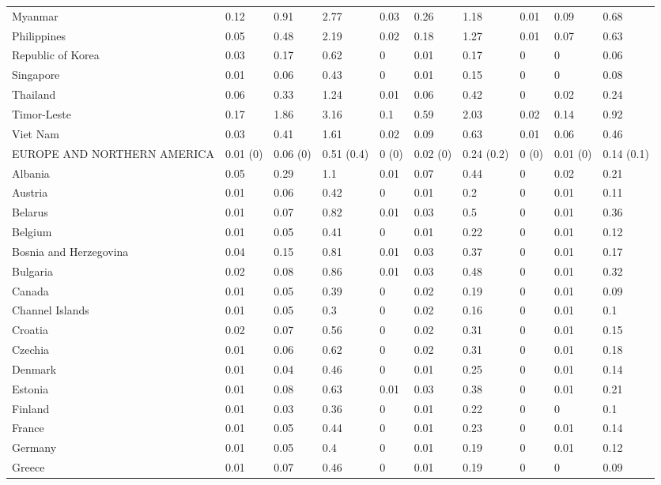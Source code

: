 \begin{longtable}[t]{llllllllll}
Myanmar & 0.12 & 0.91 & 2.77 & 0.03 & 0.26 & 1.18 & 0.01 & 0.09 & 0.68\\
Philippines & 0.05 & 0.48 & 2.19 & 0.02 & 0.18 & 1.27 & 0.01 & 0.07 & 0.63\\
Republic of Korea & 0.03 & 0.17 & 0.62 & 0 & 0.01 & 0.17 & 0 & 0 & 0.06\\
Singapore & 0.01 & 0.06 & 0.43 & 0 & 0.01 & 0.15 & 0 & 0 & 0.08\\
Thailand & 0.06 & 0.33 & 1.24 & 0.01 & 0.06 & 0.42 & 0 & 0.02 & 0.24\\
Timor-Leste & 0.17 & 1.86 & 3.16 & 0.1 & 0.59 & 2.03 & 0.02 & 0.14 & 0.92\\
Viet Nam & 0.03 & 0.41 & 1.61 & 0.02 & 0.09 & 0.63 & 0.01 & 0.06 & 0.46\\
EUROPE AND NORTHERN AMERICA & 0.01 (0) & 0.06 (0) & 0.51 (0.4) & 0 (0) & 0.02 (0) & 0.24 (0.2) & 0 (0) & 0.01 (0) & 0.14 (0.1)\\
Albania & 0.05 & 0.29 & 1.1 & 0.01 & 0.07 & 0.44 & 0 & 0.02 & 0.21\\
Austria & 0.01 & 0.06 & 0.42 & 0 & 0.01 & 0.2 & 0 & 0.01 & 0.11\\
Belarus & 0.01 & 0.07 & 0.82 & 0.01 & 0.03 & 0.5 & 0 & 0.01 & 0.36\\
Belgium & 0.01 & 0.05 & 0.41 & 0 & 0.01 & 0.22 & 0 & 0.01 & 0.12\\
Bosnia and Herzegovina & 0.04 & 0.15 & 0.81 & 0.01 & 0.03 & 0.37 & 0 & 0.01 & 0.17\\
Bulgaria & 0.02 & 0.08 & 0.86 & 0.01 & 0.03 & 0.48 & 0 & 0.01 & 0.32\\
Canada & 0.01 & 0.05 & 0.39 & 0 & 0.02 & 0.19 & 0 & 0.01 & 0.09\\
Channel Islands & 0.01 & 0.05 & 0.3 & 0 & 0.02 & 0.16 & 0 & 0.01 & 0.1\\
Croatia & 0.02 & 0.07 & 0.56 & 0 & 0.02 & 0.31 & 0 & 0.01 & 0.15\\
Czechia & 0.01 & 0.06 & 0.62 & 0 & 0.02 & 0.31 & 0 & 0.01 & 0.18\\
Denmark & 0.01 & 0.04 & 0.46 & 0 & 0.01 & 0.25 & 0 & 0.01 & 0.14\\
Estonia & 0.01 & 0.08 & 0.63 & 0.01 & 0.03 & 0.38 & 0 & 0.01 & 0.21\\
Finland & 0.01 & 0.03 & 0.36 & 0 & 0.01 & 0.22 & 0 & 0 & 0.1\\
France & 0.01 & 0.05 & 0.44 & 0 & 0.01 & 0.23 & 0 & 0.01 & 0.14\\
Germany & 0.01 & 0.05 & 0.4 & 0 & 0.01 & 0.19 & 0 & 0.01 & 0.12\\
Greece & 0.01 & 0.07 & 0.46 & 0 & 0.01 & 0.19 & 0 & 0 & 0.09\\

\end{longtable}
